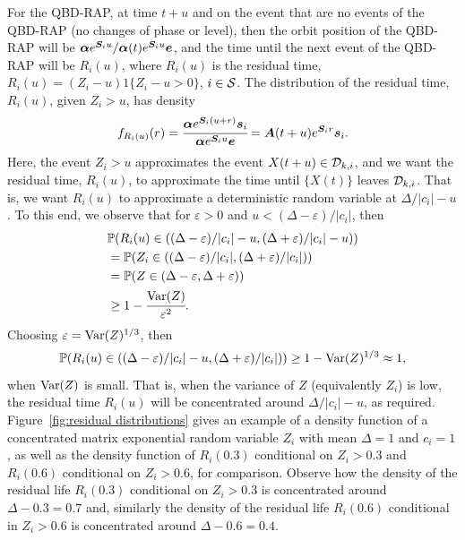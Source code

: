 For the QBD-RAP, at time \(t+u\) and on the event that are no events of the QBD-RAP (no changes of phase or level), then the orbit position of the QBD-RAP will be \(\boldsymbol \alpha e^{\boldsymbol S_iu}/\boldsymbol \alpha (t)e^{\boldsymbol S_iu}\boldsymbol e\), and the time until the next event of the QBD-RAP will be \(R_i(u)\), where \(R_i(u)\) is the residual time, \(R_i(u) = (Z_i-u)1\{Z_i-u>0\}\), \(i\in\mathcal{S}\). The distribution of the residual time, \(R_i(u)\), given \(Z_i>u\), has density 
\[f_{R_i(u)}(r) = \cfrac{\boldsymbol\alpha e^{\boldsymbol S_i(u+ r) } \boldsymbol s_i}{\boldsymbol\alpha e^{\boldsymbol S_iu } \boldsymbol e} = \boldsymbol A(t+u) e^{\boldsymbol S_i r}  \boldsymbol s_i.\]
Here, the event \(Z_i>u\) approximates the event \(X(t+u)\in\mathcal{D}_{k,i}\), and we want the residual time, \(R_i(u)\), to approximate the time until \(\{X(t)\}\) leaves \(\mathcal{D}_{k,i}\). That is, we want \(R_i(u)\) to approximate a deterministic random variable at \(\Delta/|c_i| - u\). To this end, we observe that for \(\varepsilon>0\) and \(u<(\Delta-\varepsilon)/|c_i|\), then
\begin{align*}
	&\mathbb P(R_i(u) \in{}((\Delta-\varepsilon)/|c_i|-u, (\Delta+\varepsilon)/|c_i|-u) ) 
	\\&= \mathbb P(Z_i\in{}((\Delta-\varepsilon)/|c_i|, (\Delta+\varepsilon)/|c_i|) ) 
	\\&= \mathbb P(Z\in{}(\Delta-\varepsilon, \Delta + \varepsilon))
	\\&\geq 1-\cfrac{\mathrm{Var}(Z)}{\varepsilon^2}.
\end{align*}
Choosing \(\varepsilon = \mathrm{Var}(Z)^{1/3}\), then 
\[\mathbb P(R_i(u) \in{}((\Delta-\varepsilon)/|c_i|-u, (\Delta+\varepsilon)/|c_i|) )\geq 1-\mathrm{Var}(Z)^{1/3} \approx 1, \]
when \(\mathrm{Var}(Z)\) is small. 
That is, when the variance of \(Z\) (equivalently \(Z_i\)) is low, the residual time \(R_i(u)\) will be concentrated around \(\Delta/|c_i| - u\), as required. Figure~\ref{fig:residual distributions} gives an example of a density function of a concentrated matrix exponential random variable \(Z_i\) with mean \(\Delta=1\) and \(c_i=1\), as well as the density function of \(R_i(0.3)\) conditional on \(Z_i>0.3\) and \(R_i(0.6)\) conditional on \(Z_i>0.6\), for comparison. Observe how the density of the residual life \(R_i(0.3)\) conditional on \(Z_i>0.3\) is concentrated around \(\Delta-0.3 = 0.7\) and, similarly the density of the residual life \(R_i(0.6)\) conditional in \(Z_i>0.6\) is concentrated around \(\Delta-0.6 = 0.4\).

